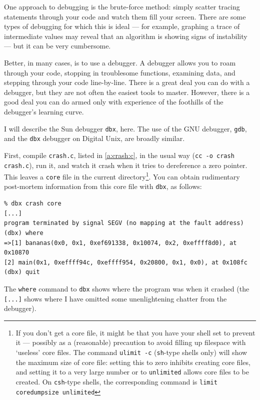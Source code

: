 \documentclass[11pt,oneside,chapters]{starlink}
\begin{document}
One approach to debugging is the brute-force method:
simply scatter tracing statements through your code and
watch them fill your screen.  There are some types of
debugging for which this is ideal --- for example, graphing
a trace of intermediate values may reveal that an
algorithm is showing signs of instability --- but it can be
very cumbersome.

Better, in many cases, is to use a debugger.  A debugger
allows you to roam through your code, stopping in
troublesome functions, examining data, and stepping
through your code line-by-line.  There is a great deal you
can do with a debugger, but they are not often the easiest
tools to master.  However, there is a good deal you can do
armed only with experience of the foothills of the
debugger's learning curve.

I will describe the Sun debugger \texttt{dbx}, here.
The use of the GNU debugger, \texttt{gdb}, and the
\texttt{dbx} debugger on Digital Unix, are broadly
similar.

First, compile \texttt{crash.c}, listed in \ref{a:crash:c},
in the usual way (\texttt{cc -o crash crash.c}),
run it, and watch it crash when it tries
to dereference a zero pointer.  This leaves a
\texttt{core} file in the current
directory\footnote{If you don't get a core file, it might
be that you have your shell set to prevent it --- possibly
as a (reasonable) precaution to avoid filling up filespace
with `useless' core files.  The command \texttt{ulimit -c}
(\texttt{sh}-type shells only) will show the
maximum size of core file: setting this to zero inhibits
creating core files, and setting it to a very large number
or to \texttt{unlimited} allows core files to be
created.  On \texttt{csh}-type shells, the
corresponding command is \texttt{limit coredumpsize unlimited}}.  You can obtain rudimentary
post-mortem information from this core file with
\texttt{dbx}, as follows:

\begin{verbatim}
% dbx crash core
[...]
program terminated by signal SEGV (no mapping at the fault address)
(dbx) where
=>[1] bananas(0x0, 0x1, 0xef691338, 0x10074, 0x2, 0xeffff8d0), at 0x10870
[2] main(0x1, 0xeffff94c, 0xeffff954, 0x20800, 0x1, 0x0), at 0x108fc
(dbx) quit
\end{verbatim}

The \texttt{where} command to \texttt{dbx} shows
where the program was when it crashed (the
\texttt{[...]} shows where I have omitted some
unenlightening chatter from the debugger).
\end{document}
